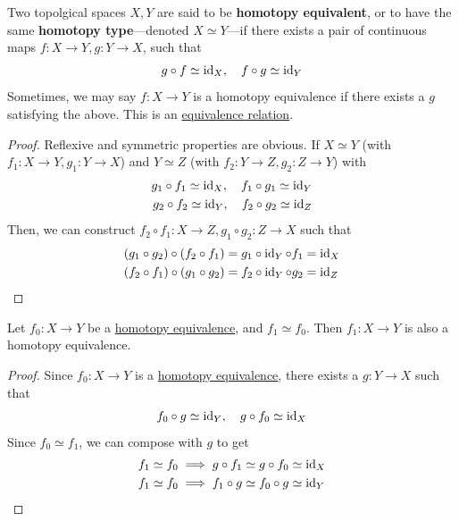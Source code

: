 	\begin{definition}
	  \label{def:homotopy-equivalence}
		Two topolgical spaces $X, Y$ are said to be \textbf{homotopy equivalent}, or to have the same \textbf{homotopy type}---denoted $X \simeq Y$---if there exists a pair of continuous maps $f: X \to Y, g: Y \to X$, such that 
		\begin{equation}
		  g \circ f \simeq \operatorname{id}_X, \quad f \circ g \simeq \operatorname{id}_Y
		\end{equation}
		Sometimes, we may say $f: X \to Y$ is a homotopy equivalence if there exists a $g$ satisfying the above. This is an \hyperref[st-def:equivalence_relation]{equivalence relation}. 
  \end{definition}
	\begin{proof}
	  Reflexive and symmetric properties are obvious. If $X \simeq Y$ (with $f_1: X \to Y, g_1: Y \to X$) and $Y \simeq Z$ (with $f_2: Y \to Z, g_2: Z \to Y$) with 
		\begin{align}
		  g_1 \circ f_1 \simeq \operatorname{id}_X, \quad f_1 \circ g_1 \simeq \operatorname{id}_Y \\ 
		  g_2 \circ f_2 \simeq \operatorname{id}_Y, \quad f_2 \circ g_2 \simeq \operatorname{id}_Z
		\end{align}
		Then, we can construct $f_2 \circ f_1: X \to Z, g_1 \circ g_2: Z \to X$ such that
		\begin{align}
			(g_1 \circ g_2) \circ (f_2 \circ f_1) & = g_1 \circ \operatorname{id}_Y \circ f_1 = \operatorname{id}_X \\ 
			(f_2 \circ f_1) \circ (g_1 \circ g_2) & = f_2 \circ \operatorname{id}_Y \circ g_2 = \operatorname{id}_Z 
		\end{align}
	\end{proof}

	\begin{lemma}
	  \label{thm:homotopic-to-homotopy-equivalence-is-homotopy}
		Let $f_0: X \to Y$ be a \hyperref[def:homotopy-equivalence]{homotopy equivalence}, and $f_1 \simeq f_0$. Then $f_1: X \to Y$ is also a homotopy equivalence. 
	\end{lemma}
	\begin{proof}
		Since $f_0: X \to Y$ is a \hyperref[def:homotopy-equivalence]{homotopy equivalence}, there exists a $g: Y \to X$ such that 
		\begin{equation}
			f_0 \circ g \simeq \operatorname{id}_Y, \quad g \circ f_0 \simeq \operatorname{id}_X
		\end{equation}
		Since $f_0 \simeq f_1$, we can compose with $g$ to get 
		\begin{align}
			f_1 \simeq f_0 & \implies g \circ f_1 \simeq g \circ f_0 \simeq \operatorname{id}_X \\ 
			f_1 \simeq f_0 & \implies f_1 \circ g \simeq f_0 \circ g \simeq \operatorname{id}_Y
		\end{align}
	\end{proof}

